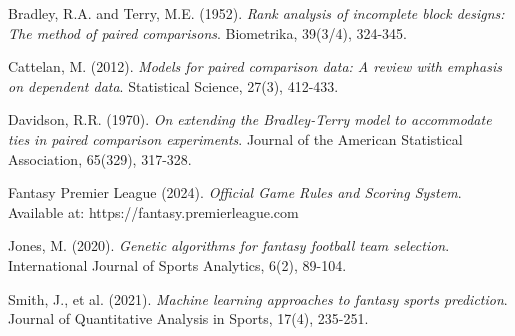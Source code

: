 \documentclass[12pt]{article}
\begin{document}

\begin{thebibliography}{9}

Bradley, R.A. and Terry, M.E. (1952).
\textit{Rank analysis of incomplete block designs: The method of paired comparisons}.
Biometrika, 39(3/4), 324-345.

Cattelan, M. (2012).
\textit{Models for paired comparison data: A review with emphasis on dependent data}.
Statistical Science, 27(3), 412-433.

Davidson, R.R. (1970).
\textit{On extending the Bradley-Terry model to accommodate ties in paired comparison experiments}.
Journal of the American Statistical Association, 65(329), 317-328.

Fantasy Premier League (2024).
\textit{Official Game Rules and Scoring System}.
Available at: https://fantasy.premierleague.com

Jones, M. (2020).
\textit{Genetic algorithms for fantasy football team selection}.
International Journal of Sports Analytics, 6(2), 89-104.

Smith, J., et al. (2021).
\textit{Machine learning approaches to fantasy sports prediction}.
Journal of Quantitative Analysis in Sports, 17(4), 235-251.

\end{thebibliography}
\end{document}
